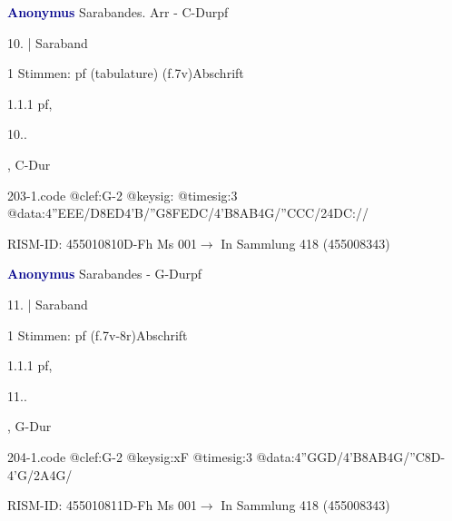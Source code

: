 \documentclass[twocolumn]{book}
\begin{document}
\par \vspace{7pt} \textcolor{darkblue}{\textbf{Anonymus  }}\hfillplus{\textbf{[203]}}\newline Sarabandes. Arr - C-Dur\newline pf
\par \begin{itshape}[f.7v, at left:] 10. | Saraband\end{itshape} 
\par \textcolor{darkblue}{}  1 Stimmen: pf (tabulature)  (f.7v)\newline Abschrift
\par 1.1.1  pf, \begin{itshape}10..\end{itshape}, C-Dur  
\begin{filecontents*}{203-1.code}
@clef:G-2
@keysig:
@timesig:3
@data:4''EEE/D{8ED}4'B/''G{8FEDC}/4'B{8AB}4G/''CCC/24DC://
\end{filecontents*}
\newline
%
\par RISM-ID: 455010810\newline D-Fh  Ms 001\newline $\rightarrow$ In Sammlung 418 (455008343)
      
\par \vspace{7pt} \textcolor{darkblue}{\textbf{Anonymus  }}\hfillplus{\textbf{[204]}}\newline Sarabandes - G-Dur\newline pf
\par \begin{itshape}[f.7v, at left:] 11. | Saraband\end{itshape} 
\par \textcolor{darkblue}{}  1 Stimmen: pf  (f.7v-8r)\newline Abschrift
\par 1.1.1  pf, \begin{itshape}11..\end{itshape}, G-Dur  
\begin{filecontents*}{204-1.code}
@clef:G-2
@keysig:xF
@timesig:3
@data:4''GGD/4'B{8AB}4G/''C8D-4'G/2A4G/
\end{filecontents*}
\newline
%
\par RISM-ID: 455010811\newline D-Fh  Ms 001\newline $\rightarrow$ In Sammlung 418 (455008343)
      
\end{document}
